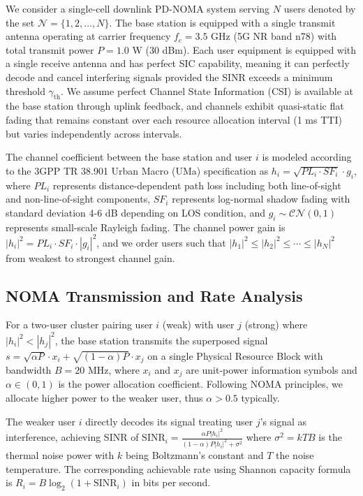 We consider a single-cell downlink PD-NOMA system serving $N$ users denoted by the set $\mathcal{N} = \{1, 2, \ldots, N\}$. The base station is equipped with a single transmit antenna operating at carrier frequency $f_c = 3.5$ GHz (5G NR band n78) with total transmit power $P = 1.0$ W (30 dBm). Each user equipment is equipped with a single receive antenna and has perfect SIC capability, meaning it can perfectly decode and cancel interfering signals provided the SINR exceeds a minimum threshold $\gamma_{\text{th}}$. We assume perfect Channel State Information (CSI) is available at the base station through uplink feedback, and channels exhibit quasi-static flat fading that remains constant over each resource allocation interval (1 ms TTI) but varies independently across intervals.

The channel coefficient between the base station and user $i$ is modeled according to the 3GPP TR 38.901 Urban Macro (UMa) specification as $h_i = \sqrt{PL_i \cdot SF_i} \cdot g_i$, where $PL_i$ represents distance-dependent path loss including both line-of-sight and non-line-of-sight components, $SF_i$ represents log-normal shadow fading with standard deviation 4-6 dB depending on LOS condition, and $g_i \sim \mathcal{CN}(0,1)$ represents small-scale Rayleigh fading. The channel power gain is $|h_i|^2 = PL_i \cdot SF_i \cdot |g_i|^2$, and we order users such that $|h_1|^2 \leq |h_2|^2 \leq \cdots \leq |h_N|^2$ from weakest to strongest channel gain.

\subsection{NOMA Transmission and Rate Analysis}

For a two-user cluster pairing user $i$ (weak) with user $j$ (strong) where $|h_i|^2 < |h_j|^2$, the base station transmits the superposed signal $s = \sqrt{\alpha P} \cdot x_i + \sqrt{(1-\alpha) P} \cdot x_j$ on a single Physical Resource Block with bandwidth $B = 20$ MHz, where $x_i$ and $x_j$ are unit-power information symbols and $\alpha \in (0,1)$ is the power allocation coefficient. Following NOMA principles, we allocate higher power to the weaker user, thus $\alpha > 0.5$ typically.

The weaker user $i$ directly decodes its signal treating user $j$'s signal as interference, achieving SINR of $\text{SINR}_i = \frac{\alpha P |h_i|^2}{(1-\alpha) P |h_i|^2 + \sigma^2}$ where $\sigma^2 = kTB$ is the thermal noise power with $k$ being Boltzmann's constant and $T$ the noise temperature. The corresponding achievable rate using Shannon capacity formula is $R_i = B \log_2(1 + \text{SINR}_i)$ in bits per second.

